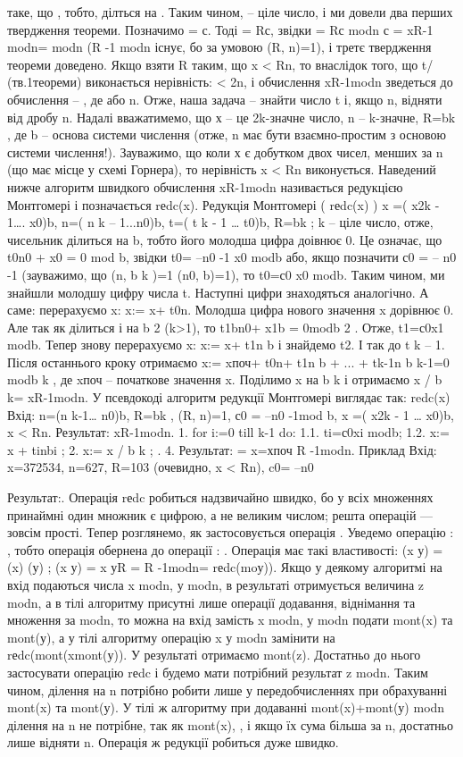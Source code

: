 таке, що , тобто,  ділться на . Таким чином,
– ціле число, і ми довели два перших твердження теореми.
Позначимо = с. Тоді = Rс, звідки = Rс modn
с = xR-1 modn= modn (R
-1 modn існує, бо за умовою (R, n)=1), і третє
твердження теореми доведено.
Якщо взяти R таким, що x < Rn, то внаслідок того, що t/ (тв.1теореми)
виконається нерівність: < 2n, і обчислення xR-1modn зведеться до
обчислення – , де  або n. Отже, наша задача – знайти число t і,
якщо n, відняти від дробу n.
Надалі вважатимемо, що х – це 2k-значне число, n – k-значне, R=bk
, де b
– основа системи числення (отже, n має бути взаємно-простим з основою
системи числення!). Зауважимо, що коли х є добутком двох чисел, менших за n
(що має місце у схемі Горнера), то нерівність x < Rn виконується.
Наведений нижче алгоритм швидкого обчислення xR-1modn називається
редукцією Монтгомері і позначається rеdc(x).
Редукція Монтгомері ( rеdc(x) )
x =( x2k - 1…. x0)b, n=( n k – 1...n0)b, t=( t k - 1 … t0)b, R=bk
;
k – ціле
число, отже, чисельник ділиться на b, тобто його молодша цифра доівнює 0. Це
означає, що t0n0 + x0 = 0 mod b, звідки
t0= –n0
-1
x0 modb
або, якщо позначити с0 = – n0
-1
(зауважимо, що (n, b
k
)=1 (n0, b)=1), то
t0=с0 x0 modb.
Таким чином, ми знайшли молодшу цифру числа t. Наступні цифри
знаходяться аналогічно. А саме:
перерахуємо x: x:= x+ t0n. Молодша цифра нового значення x дорівнює 0.
Але так як ділиться і на b
2
(k>1), то t1bn0+ x1b = 0modb
2
. Отже,
t1=с0x1 modb.
Тепер знову перерахуємо x: x:= x+ t1n b і знайдемо t2. І так до t k – 1. Після
останнього кроку отримаємо
x:= xпоч+ t0n+ t1n b + ... + tk-1n b
k-1=0 modb
k
,
де xпоч – початкове значення x. Поділимо x на b
k
і отримаємо
x / b
k= xR-1modn.
У псевдокоді алгоритм редукції Монтгомері виглядає так:
redc(x)
Вхід: n=(n k-1… n0)b, R=bk
, (R, n)=1, с0 = –n0
-1mod b,
x =( x2k - 1 … x0)b, x < Rn.
Результат: xR-1modn.
1. for i:=0 till k-1 do:
1.1. ti=с0xi modb;
1.2. x:= x + tinbi
;
2. x:= x / b
k
;
.
4. Результат: = x=хпоч R
-1modn.
Приклад
Вхід: x=372534, n=627, R=103
(очевидно, x < Rn), c0= –n0









Результат:.
Операція rеdc робиться надзвичайно швидко, бо у всіх множеннях
принаймні один множник є цифрою, а не великим числом; решта операцій ---
зовсім прості.
Тепер розглянемо, як застосовується операція .
Уведемо операцію :
,
тобто операція  обернена до операції :
.
Операція  має такі властивості:
(x у) = (x) (у) ;
(x у) = x уR =  R
-1modn= rеdc(moу)).
Якщо у деякому алгоритмі на вхід подаються числа x modn, у modn, в
результаті отримується величина z modn, а в тілі алгоритму присутні лише
операції додавання, віднімання та множення за modn, то можна на вхід замість
x modn, у modn подати mont(x) та mont(у), а у тілі алгоритму операцію
x у modn замінити на rеdc(mont(xmont(у)). У результаті отримаємо mont(z).
Достатньо до нього застосувати операцію rеdc і будемо мати потрібний
результат z modn. Таким чином, ділення на n потрібно робити лише у
передобчисленнях при обрахуванні mont(x) та mont(у). У тілі ж алгоритму при
додаванні mont(x)+mont(у) modn ділення на n не потрібне, так як mont(x),
, і якщо їх сума більша за n, достатньо лише відняти n. Операція ж
редукції робиться дуже швидко.

